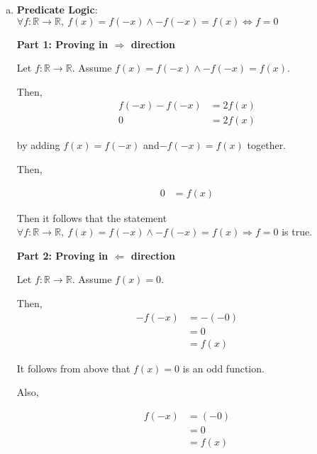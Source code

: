 \documentclass[12pt]{article}
\begin{document}
\begin{enumerate}[a.]
    \item

    \textbf{Predicate Logic}: $\forall f: \mathbb{R} \to \mathbb{R},\: f(x) = f(-x) \land
    -f(-x) = f(x) \Leftrightarrow f = 0$

    \bigbreak

    \textbf{Part 1: Proving in $\Rightarrow$ direction}

    \bigbreak

    Let $f: \mathbb{R} \to \mathbb{R}$. Assume $f(x) = f(-x) \land -f(-x)=f(x)$.

    \bigbreak

    Then,
    \setcounter{equation}{0}
    \begin{align}
        f(-x) - f(-x) &= 2f(x)\\
        0 &= 2f(x)
    \end{align}

    by adding $f(x) = f(-x)$ and$-f(-x) = f(x)$ together.

    \bigbreak

    Then,

    \begin{align}
        0 &= f(x)
    \end{align}

    \bigbreak

    Then it follows that the statement $\forall f: \mathbb{R} \to \mathbb{R},\:
    f(x) = f(-x) \land -f(-x) = f(x) \Rightarrow f = 0$ is true.

    \bigbreak

    \textbf{Part 2: Proving in $\Leftarrow$ direction}

    \bigbreak

    Let $f: \mathbb{R} \to \mathbb{R}$. Assume $f(x) = 0$.

    \bigbreak

    Then,
    \setcounter{equation}{0}
    \begin{align}
        -f(-x) &= -(-0)\\
        &= 0\\
        &= f(x)
    \end{align}

    It follows from above that $f(x) = 0$ is an odd function.

    \bigbreak

    Also,

    \begin{align}
        f(-x) &= (-0)\\
        &= 0\\
        &= f(x)
    \end{align}


\end{enumerate}
\end{document}
